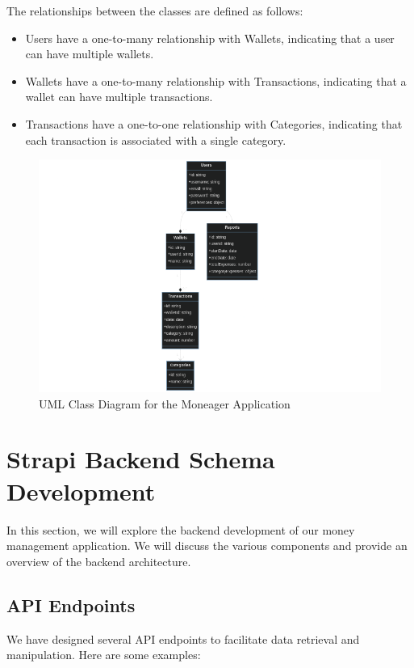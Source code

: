The relationships between the classes are defined as follows:

\begin{itemize}
  \item Users have a one-to-many relationship with Wallets, indicating that a user can have multiple wallets.
  \item Wallets have a one-to-many relationship with Transactions, indicating that a wallet can have multiple transactions.
  \item Transactions have a one-to-one relationship with Categories, indicating that each transaction is associated with a single category.
\end{itemize}

\begin{figure}[ht]
    \centering
    \includegraphics[width=\textwidth]{Diagram/DatabaseUmlDiagram_Reports.png}
    \caption{UML Class Diagram for the Moneager Application}
    \label{fig:class-diagram}
\end{figure}



\section{Strapi Backend Schema Development }
\label{sec:strapi}

In this section, we will explore the backend development of our money management application. We will discuss the various components and provide an overview of the backend architecture.

\subsection{API Endpoints}
We have designed several API endpoints to facilitate data retrieval and manipulation. Here are some examples:

